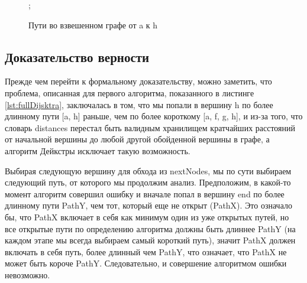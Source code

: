 \documentclass[../article.tex]{subfiles}
\begin{document}
\begin{figure}
\begin{styledtikz}

        ;
    \end{styledtikz}
    \caption{Пути во взвешенном графе от {\firacodebold a} к {\firacodebold h}}
    \label{fig:dijkstraProve}
\end{figure}

\subsection{Доказательство верности} \label{dijkstraProve}

Прежде чем перейти к формальному доказательству, можно заметить, что проблема, описанная для первого алгоритма, показанного в листинге \ref{lst:fullDijsktra}, заключалась в том, что мы попали в вершину h по более длинному пути [a, h] раньше, чем по более короткому [a, f, g, h], и из-за того, что словарь distances перестал быть валидным хранилищем кратчайших расстояний от начальной вершины до любой другой обойденной вершины в графе, а алгоритм Дейкстры исключает такую возможность.

Выбирая следующую вершину для обхода из nextNodes, мы по сути выбираем следующий путь, от которого мы продолжим анализ. Предположим, в какой-то момент алгоритм совершил ошибку и вначале попал в вершину end по более длинному пути PathY, чем тот, который еще не открыт (PathX). Это означало бы, что PathX включает в себя как минимум один из уже открытых путей, но все открытые пути по определению алгоритма должны быть длиннее PathY (на каждом этапе мы всегда выбираем самый короткий путь), значит PathX должен включать в себя путь, более длинный чем PathY, что означает, что PathX не может быть короче PathY. Следовательно, и совершение алгоритмом ошибки невозможно.
\end{document}
